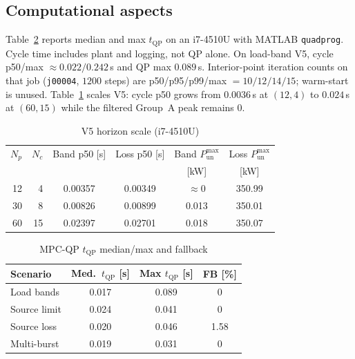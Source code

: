 \documentclass{ieeeaccess}
\begin{document}
\subsection{Computational aspects}
Table~\ref{tab:tqp} reports median and max $t_{\mathrm{QP}}$ on an i7-4510U with MATLAB \texttt{quadprog}. Cycle time includes plant and logging, not QP alone. On load-band V5, cycle p50/max $\approx 0.022/0.242$\,s and QP max $0.089$\,s. Interior-point iteration counts on that job (\texttt{j00004}, $1200$ steps) are p50/p95/p99/max $=10/12/14/15$; warm-start is unused. Table~\ref{tab:horizon} scales V5: cycle p50 grows from $0.0036$\,s at $(12,4)$ to $0.024$\,s at $(60,15)$ while the filtered Group~A peak remains 0.

\begin{table}[!t]
\centering
\caption{V5 horizon scale (i7-4510U)}
\label{tab:horizon}
{\footnotesize\setlength{\tabcolsep}{2.5pt}%
\begin{tabular}{@{}rrcccc@{}}
\toprule
$N_p$ & $N_c$ & Band p50 [s] & Loss p50 [s] & Band $P_{\mathrm{un}}^{\max}$ & Loss $P_{\mathrm{un}}^{\max}$ \\
 &  &  &  & [kW] & [kW] \\
\midrule
12 & 4 & 0.00357 & 0.00349 & $\approx 0$ & 350.99 \\
30 & 8 & 0.00826 & 0.00899 & 0.013 & 350.01 \\
60 & 15 & 0.02397 & 0.02701 & 0.018 & 350.07 \\
\bottomrule
\end{tabular}}
\end{table}

\begin{table}[!t]
\centering
\caption{MPC-QP $t_{\mathrm{QP}}$ median/max and fallback}
\label{tab:tqp}
\begin{tabular}{@{}lccc@{}}
\toprule
Scenario & Med.\ $t_{\mathrm{QP}}$ [s] & Max $t_{\mathrm{QP}}$ [s] & FB [\%] \\
\midrule
Load bands & 0.017 & 0.089 & 0 \\
Source limit & 0.024 & 0.041 & 0 \\
Source loss & 0.020 & 0.046 & 1.58 \\
Multi-burst & 0.019 & 0.031 & 0 \\
\bottomrule
\end{tabular}
\end{table}
\end{document}
